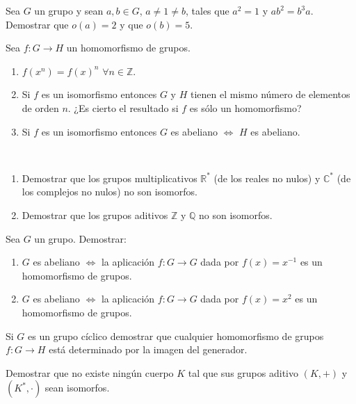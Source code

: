 \begin{ejercicio}\label{ej:2.34}
    Sea $G$ un grupo y sean $a, b \in G$, $a \neq 1 \neq b$, tales que $a^2 = 1$ y $ab^2 = b^3a$. Demostrar que $o(a) = 2$ y que $o(b) = 5$.
\end{ejercicio}

\begin{ejercicio}\label{ej:2.35}
    Sea $f : G \to H$ un homomorfismo de grupos.
    \begin{enumerate}
        \item $f(x^n) = f(x)^n$ $\forall n \in \mathbb{Z}$.
        \item Si $f$ es un isomorfismo entonces $G$ y $H$ tienen el mismo número de elementos de orden $n$. ¿Es cierto el resultado si $f$ es sólo un homomorfismo?
        \item Si $f$ es un isomorfismo entonces $G$ es abeliano $\Leftrightarrow$ $H$ es abeliano.
    \end{enumerate}
\end{ejercicio}

\begin{ejercicio}\label{ej:2.36}~
    \begin{enumerate}
        \item Demostrar que los grupos multiplicativos $\mathbb{R}^{\ast}$ (de los reales no nulos) y $\mathbb{C}^{\ast}$ (de los complejos no nulos) no son isomorfos.
        \item Demostrar que los grupos aditivos $\mathbb{Z}$ y $\mathbb{Q}$ no son isomorfos.
    \end{enumerate}
\end{ejercicio}

\begin{ejercicio}\label{ej:2.37}
    Sea $G$ un grupo. Demostrar:
    \begin{enumerate}
        \item $G$ es abeliano $\iff$ la aplicación $f : G \to G$ dada por $f(x) = x^{-1}$ es un homomorfismo de grupos.
        \item $G$ es abeliano $\iff$ la aplicación $f : G \to G$ dada por $f(x) = x^2$ es un homomorfismo de grupos.
    \end{enumerate}
\end{ejercicio}


\begin{ejercicio}\label{ej:2.38}
    Si $G$ es un grupo cíclico demostrar que cualquier homomorfismo de grupos $f : G \to H$ está determinado por la imagen del generador.
\end{ejercicio}

\begin{ejercicio}\label{ej:2.39}
    Demostrar que no existe ningún cuerpo $K$ tal que sus grupos aditivo $(K, +)$ y $(K^{\ast}, \cdot)$ sean isomorfos.
\end{ejercicio}